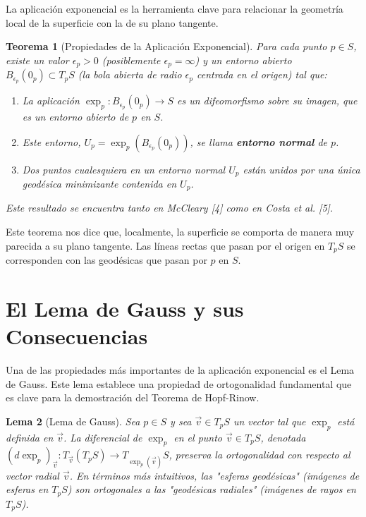 \documentclass[12pt, a4paper]{report}
\theoremstyle{miestilo}
\newtheorem{teorema}{Teorema}[chapter]
\newtheorem{lema}[teorema]{Lema}
\theoremstyle{midefinicion}
\begin{document}
La aplicación exponencial es la herramienta clave para relacionar la geometría local de la superficie con la de su plano tangente.

\begin{teorema}[Propiedades de la Aplicación Exponencial]
Para cada punto $p \in S$, existe un valor $\epsilon_p > 0$ (posiblemente $\epsilon_p = \infty$) y un entorno abierto $B_{\epsilon_p}(0_p) \subset T_pS$ (la bola abierta de radio $\epsilon_p$ centrada en el origen) tal que:
\begin{enumerate}
    \item La aplicación $\exp_p: B_{\epsilon_p}(0_p) \to S$ es un difeomorfismo sobre su imagen, que es un entorno abierto de $p$ en $S$.
    \item Este entorno, $U_p = \exp_p(B_{\epsilon_p}(0_p))$, se llama \textbf{entorno normal} de $p$.
    \item Dos puntos cualesquiera en un entorno normal $U_p$ están unidos por una única geodésica minimizante contenida en $U_p$.
\end{enumerate}
Este resultado se encuentra tanto en McCleary [4] como en Costa et al. [5].
\end{teorema}

Este teorema nos dice que, localmente, la superficie se comporta de manera muy parecida a su plano tangente. Las líneas rectas que pasan por el origen en $T_pS$ se corresponden con las geodésicas que pasan por $p$ en $S$.

\section{El Lema de Gauss y sus Consecuencias}

Una de las propiedades más importantes de la aplicación exponencial es el Lema de Gauss. Este lema establece una propiedad de ortogonalidad fundamental que es clave para la demostración del Teorema de Hopf-Rinow.

\begin{lema}[Lema de Gauss]
Sea $p \in S$ y sea $\vec{v} \in T_pS$ un vector tal que $\exp_p$ está definida en $\vec{v}$. La diferencial de $\exp_p$ en el punto $\vec{v} \in T_pS$, denotada $(d\exp_p)_{\vec{v}}: T_{\vec{v}}(T_pS) \to T_{\exp_p(\vec{v})}S$, preserva la ortogonalidad con respecto al vector radial $\vec{v}$. En términos más intuitivos, las "esferas geodésicas" (imágenes de esferas en $T_pS$) son ortogonales a las "geodésicas radiales" (imágenes de rayos en $T_pS$).
\end{lema}
\end{document}
